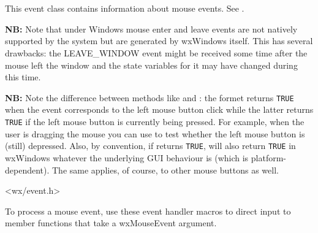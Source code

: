 \section{}\label{wxmouseevent}

This event class contains information about mouse events.
See .

{\bf NB: } Note that under Windows mouse enter and leave events are not natively supported
by the system but are generated by wxWindows itself. This has several
drawbacks: the LEAVE\_WINDOW event might be received some time after the mouse
left the window and the state variables for it may have changed during this
time.

{\bf NB: } Note the difference between methods like 
 and 
: the formet returns {\tt TRUE}
when the event corresponds to the left mouse button click while the latter
returns {\tt TRUE} if the left mouse button is currently being pressed. For
example, when the user is dragging the mouse you can use 
 to test
whether the left mouse button is (still) depressed. Also, by convention, if
 returns {\tt TRUE}, 
 will also return {\tt TRUE} in
wxWindows whatever the underlying GUI behaviour is (which is
platform-dependent). The same applies, of course, to other mouse buttons as
well.




<wx/event.h>


To process a mouse event, use these event handler macros to direct input to member
functions that take a wxMouseEvent argument.

\twocolwidtha{7cm}
\begin{twocollist}\itemsep=0pt
\end{twocollist}%

